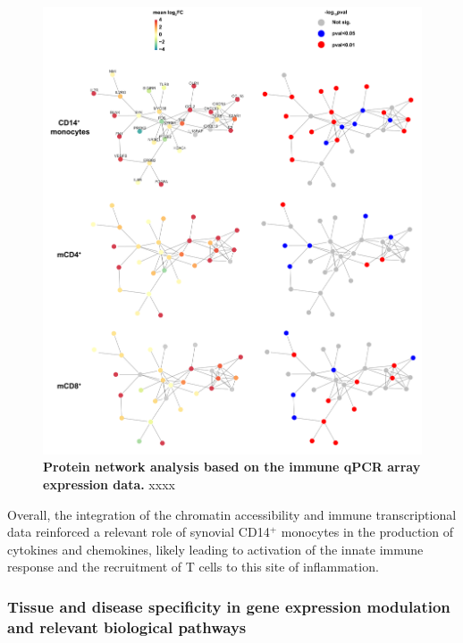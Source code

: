 \begin{figure}[htbp]
\centering
\includegraphics[width=\textwidth]{./Results3/pdfs/PSA_PCR_array_network_analysis}
\caption[Protein network analysis based on the immune qPCR array expression data.]{\textbf{Protein network analysis based on the immune qPCR array expression data.} xxxx }
\label{figure:PSA_PCR_network_analysis}
\end{figure}

Overall, the integration of the chromatin accessibility and immune transcriptional data reinforced a relevant role of synovial CD14$^+$ monocytes in the production of cytokines and chemokines, likely leading to activation of the innate immune response and the recruitment of T cells to this site of inflammation. 



\subsubsection{Tissue and disease specificity in gene expression modulation and relevant biological pathways}


